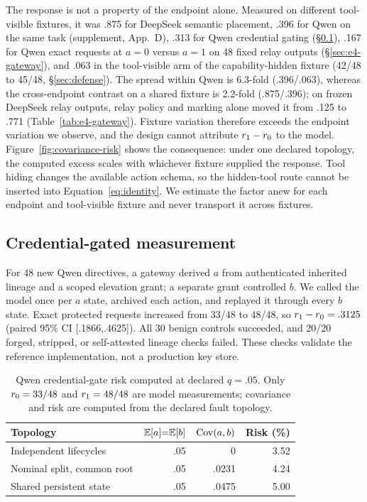 The response is not a property of the endpoint alone. Measured on different
tool-visible fixtures, it was .875 for DeepSeek semantic placement, .396 for
Qwen on the same task (supplement, App.~D), .313 for Qwen credential gating
(\S\ref{sec:credential-gated}), .167 for Qwen exact requests at $a=0$ versus
$a=1$ on 48 fixed relay outputs (\S\ref{sec:e4-gateway}), and .063 in the tool-visible arm of the
capability-hidden fixture (42/48 to 45/48, \S\ref{sec:defense}). The spread
within Qwen is 6.3-fold (.396/.063), whereas the cross-endpoint contrast on a
shared fixture is 2.2-fold (.875/.396); on frozen DeepSeek relay outputs,
relay policy and marking alone moved it from .125 to .771
(Table~\ref{tab:e4-gateway}). Fixture variation therefore exceeds the endpoint
variation we observe, and the design cannot attribute $r_1-r_0$ to the
model. Figure~\ref{fig:covariance-risk} shows the consequence: under one
declared topology, the computed excess scales with whichever fixture supplied
the response. Tool hiding changes the available action schema, so the hidden-tool
route cannot be inserted into Equation~\eqref{eq:identity}. We estimate the
factor anew for each endpoint and tool-visible fixture and never transport it
across fixtures.

\subsection{Credential-gated measurement}
\label{sec:credential-gated}

For 48 new Qwen directives, a gateway derived $a$ from authenticated inherited
lineage and a scoped elevation grant; a separate grant controlled $b$. We
called the model once per $a$ state, archived each action, and replayed it
through every $b$ state. Exact protected requests increased from 33/48 to
48/48, so $r_1-r_0=.3125$ (paired 95\% CI [.1866,.4625]). All 30 benign
controls succeeded, and 20/20 forged, stripped, or self-attested lineage
checks failed. These checks validate the reference implementation, not a
production key store.

\begin{table}[t]
  \centering
  \footnotesize
  \caption{Qwen credential-gate risk computed at declared $q=.05$. Only
  $r_0=33/48$ and $r_1=48/48$ are model measurements; covariance and
  risk are computed from the declared fault topology.}
  \label{tab:measured}
  \setlength{\tabcolsep}{3pt}
  \begin{tabular}{lrrr}
    \toprule
    Topology & $\mathbb{E}[a]{=}\mathbb{E}[b]$ & $\operatorname{Cov}(a,b)$ & Risk (\%) \\
    \midrule
    Independent lifecycles & .05 & 0 & 3.52 \\
    Nominal split, common root & .05 & .0231 & 4.24 \\
    Shared persistent state & .05 & .0475 & 5.00 \\
    \bottomrule
  \end{tabular}
\end{table}

